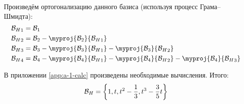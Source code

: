 Произведём ортогонализацию данного базиса (используя процесс Грама--Шмидта):
\begin{align*}
  \BsH_1 &= \Bs_1 \\
  \BsH_2 &= \Bs_2 - \myproj{\Bs_2}{\BsH_1} \\
  \BsH_3 &= \Bs_3 - \myproj{\Bs_3}{\BsH_1} - \myproj{\Bs_3}{\BsH_2} \\
  \BsH_4 &= \Bs_4 - \myproj{\Bs_4}{\BsH_1} - \myproj{\Bs_4}{\BsH_2}
    - \myproj{\Bs_4}{\BsH_3}
\end{align*}

В приложении \ref{app:a-1-calc} произведены необходимые вычисления.
Итого:
\[{\mathcal{B}_H} = \left\{ 1, t, t^2 - \frac{1}{3}, t^3 - \frac{3}{5}t \right\}\]
